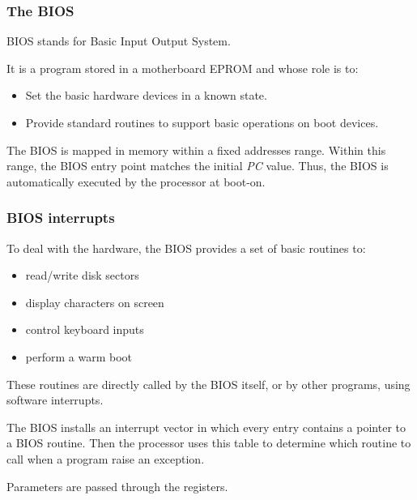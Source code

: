 %
%
%

\begin{frame}
  \frametitle{The BIOS}

  BIOS stands for Basic Input Output System.

  \-

  It is a program stored in a motherboard EPROM and whose role is to:
  \begin{itemize}
  \item Set the basic hardware devices in a known state.
  \item Provide standard routines to support basic operations on boot devices.
  \end{itemize}

  \-

  The BIOS is mapped in memory within a fixed addresses range. Within this range, the BIOS entry point matches the initial {\em PC} value. Thus, the BIOS is automatically executed by the processor at boot-on.

\end{frame}

%
%
%

\begin{frame}
  \frametitle{BIOS interrupts}

  To deal with the hardware, the BIOS provides a set of basic routines to:

  \begin{itemize}
  \item read/write disk sectors
  \item display characters on screen
  \item control keyboard inputs
  \item perform a warm boot
  \end{itemize}

  \-

  These routines are directly called by the BIOS itself, or by other programs, using software interrupts.

  \-

  The BIOS installs an interrupt vector in which every entry contains a pointer to a BIOS routine. Then the processor uses this table to determine which routine to call when a program raise an exception.

  \-

  Parameters are passed through the registers.

\end{frame}

%
%
%

